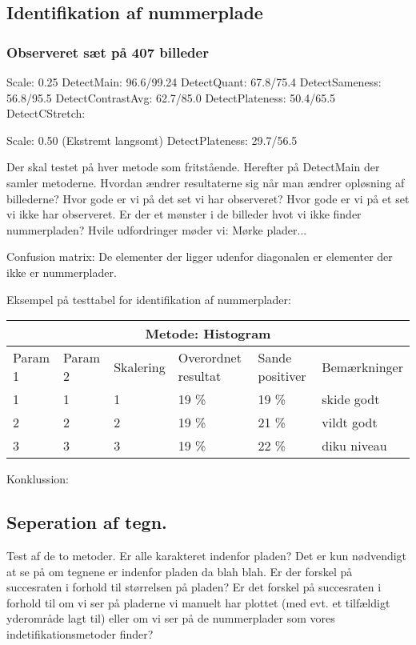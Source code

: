 \subsection{Identifikation af nummerplade}

\subsubsection*{Observeret sæt på 407 billeder}
Scale: 0.25
DetectMain: 96.6/99.24
DetectQuant: 67.8/75.4
DetectSameness: 56.8/95.5
DetectContrastAvg: 62.7/85.0
DetectPlateness: 50.4/65.5
DetectCStretch: 

Scale: 0.50 (Ekstremt langsomt)
DetectPlateness: 29.7/56.5


Der skal testet på hver metode som fritstående. Herefter på DetectMain der samler metoderne. Hvordan ændrer resultaterne sig når man ændrer opløsning af billederne?
Hvor gode er vi på det set vi har observeret? Hvor gode er vi på et set vi ikke har observeret. Er der et mønster i de billeder hvot vi ikke finder nummerpladen? Hvile udfordringer møder vi: Mørke plader... 

Confusion matrix: De elementer der ligger udenfor diagonalen er elementer der ikke er nummerplader.

Eksempel på testtabel for identifikation af nummerplader:

\begin{tabular}{|l|l|l|l|l|l|}
\hline
\multicolumn{6}{|c|}{Metode: Histogram} \\ \hline
Param 1 & Param 2 & Skalering & Overordnet resultat & Sande positiver & Bemærkninger\\ \hline
1 & 1 & 1 & 19 \% & 19 \% & skide godt\\ \hline
2 & 2 & 2 & 19 \% & 21 \% & vildt godt \\ \hline
3 & 3 & 3 & 19 \% & 22 \% & diku niveau \\
\hline
\end{tabular}

Konklussion:

\subsection{Seperation af tegn.}
Test af de to metoder.
Er alle karakteret indenfor pladen? Det er kun nødvendigt at se på om tegnene er indenfor pladen da blah blah. Er der forskel på succesraten i forhold til størrelsen på pladen? Er det forskel på succesraten i forhold til om vi ser på pladerne vi manuelt har plottet (med evt. et tilfældigt yderområde lagt til) eller om vi ser på de nummerplader som vores indetifikationsmetoder finder?

